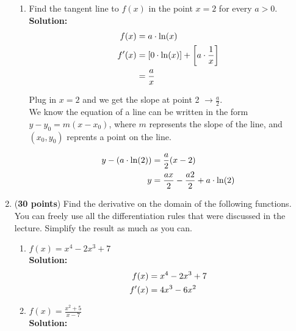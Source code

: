 \documentclass[a4paper]{article}
\begin{document}
\begin{enumerate}
\begin{enumerate}
		
	\item Find the tangent line to $f(x)$ in the point $x = 2$ for every $a > 0$.\\
	\textbf{Solution:}\\
	
	
	\begin{align*}
		f(x) &= a \cdot \ln(x)\notag\\
		f'(x) &= \left[ 0 \cdot \ln(x)\right] + \left[ a \cdot \frac{1}{x}\right]\notag\\
		&= \frac{a}{x}
	\end{align*}
	
Plug in $x = 2$ and we get the slope at point 2 $\rightarrow \frac{a}{2}$.\\	
	
We know the equation of a line can be written in the form $y - y_0 = m(x - x_0)$, where $m$ represents the slope of the line, and $(x_0,y_0)$ reprents a point on the line.

\begin{align*}
	y - (a \cdot \ln(2)) &= \frac{a}{2}(x - 2)\notag\\
	y &= \frac{ax}{2} - \frac{a2}{2} + a \cdot \ln(2)\notag
\end{align*}	
	
	
\end{enumerate}

\newpage

\item (\textbf{30 points}) Find the derivative on the domain of the following functions. You can freely use all the differentiation rules that were discussed in the lecture. Simplify the result as much as you can.

\begin{enumerate}
	\item $f(x) = x^4 - 2x^3 +7$\\
	\textbf{Solution:}\\		
	
	
\begin{align}
	f(x) &= x^4 - 2x^3 +7\notag\\
	f'(x) &= 4x^3 - 6x^2\notag
\end{align}	
	
	\item $f(x) = \frac{x^2 + 5}{x - 7}$\\
	\textbf{Solution:}\\
	
	

\end{enumerate}
\end{enumerate}
\end{document}
